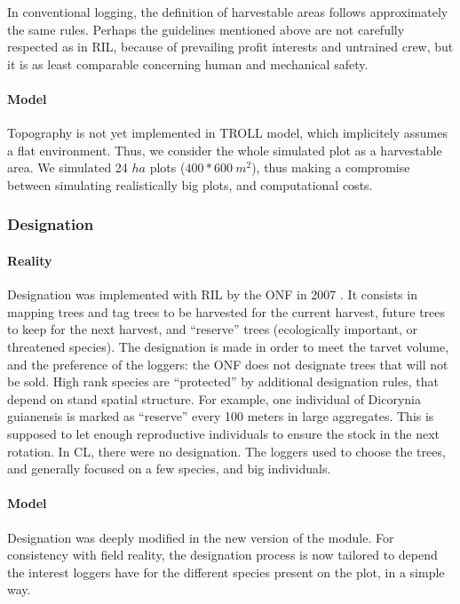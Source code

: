 \documentclass[12pt,]{article}
\theoremstyle{definition}
\theoremstyle{definition}
\theoremstyle{definition}
\theoremstyle{remark}
\begin{document}
In conventional logging, the definition of harvestable areas follows
approximately the same rules. Perhaps the guidelines mentioned above are
not carefully respected as in RIL, because of prevailing profit
interests and untrained crew, but it is as least comparable concerning
human and mechanical safety.

\paragraph{Model}\label{model}

Topography is not yet implemented in TROLL model, which implicitely
assumes a flat environment. Thus, we consider the whole simulated plot
as a harvestable area. We simulated 24 \(ha\) plots (\(400*600\ m^2\)),
thus making a compromise between simulating realistically big plots, and
computational costs.

\subsubsection{Designation}\label{designation}

\paragraph{Reality}\label{reality-1}

Designation was implemented with RIL by the ONF in 2007
\citep{Guitet2011}. It consists in mapping trees and tag trees to be
harvested for the current harvest, future trees to keep for the next
harvest, and ``reserve'' trees (ecologically important, or threatened
species). The designation is made in order to meet the tarvet volume,
and the preference of the loggers: the ONF does not designate trees that
will not be sold. High rank species are ``protected'' by additional
designation rules, that depend on stand spatial structure. For example,
one individual of Dicorynia guianensis is marked as ``reserve'' every
100 meters in large aggregates. This is supposed to let enough
reproductive individuals to ensure the stock in the next rotation. In
CL, there were no designation. The loggers used to choose the trees, and
generally focused on a few species, and big individuals.

\paragraph{Model}\label{model-1}

Designation was deeply modified in the new version of the module. For
consistency with field reality, the designation process is now tailored
to depend the interest loggers have for the different species present on
the plot, in a simple way.
\end{document}
